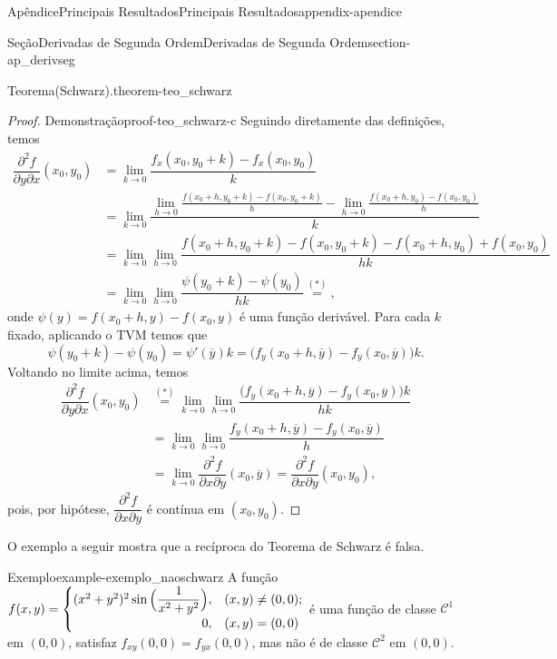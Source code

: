 \documentclass[oneside,10pt,]{book}
\numberwithin{equation}{section}
\begin{document}
\begin{appendixptx}{Apêndice}{Principais Resultados}{}{Principais Resultados}{}{}{appendix-apendice}
\begin{sectionptx}{Seção}{Derivadas de Segunda Ordem}{}{Derivadas de Segunda Ordem}{}{}{section-ap_derivseg}
\begin{theorem}{Teorema}{(Schwarz).}{}{theorem-teo_schwarz}
\end{theorem}
\begin{proof}{Demonstração}{}{proof-teo_schwarz-c}
Seguindo diretamente das definições, temos%
\begin{align*}
\dfrac{\partial^2 f}{\partial y\partial
x}(x_0,y_0)
&=\lim\limits_{k\to
0}\dfrac{f_x(x_0,y_0+k)-f_x(x_0,y_0)}{k}\\
&=\lim\limits_{k\to
0}\dfrac{\lim\limits_{h\to
0}\frac{f(x_0+h,y_0+k)-f(x_0,y_0+k)}{h}-\lim\limits_{h\to
0}\frac{f(x_0+h,y_0)-f(x_0,y_0)}{h}}{k}\\
&=\lim\limits_{k\to 0}\lim\limits_{h\to 0}
\dfrac{f(x_0+h,y_0+k)-f(x_0,y_0+k)-f(x_0+h,y_0)+f(x_0,y_0)}{hk}\\
&=\lim\limits_{k\to 0}\lim\limits_{h\to 0}
\dfrac{\psi(y_0+k)-\psi(y_0)}{hk}\stackrel{(\ast)}{=},
\end{align*}
onde \(\psi(y)=f(x_0+h,y)-f(x_0,y)\) é uma função derivável. Para cada \(k\) fixado, aplicando o TVM temos que%
\begin{equation*}
\psi(y_0+k)-\psi(y_0)=\psi'(\overline{y})k=\big(f_y(x_0+h,\overline{y})
-f_y(x_0,\overline{y})\big)k.
\end{equation*}
Voltando no limite acima, temos%
\begin{align*}
\dfrac{\partial^2 f}{\partial y\partial
x}(x_0,y_0)
&\stackrel{(\ast)}{=}\lim\limits_{k\to 0}\lim\limits_{h\to 0}
\dfrac{\big(f_y(x_0+h,\overline{y})
-f_y(x_0,\overline{y})\big)k}{hk}\\
&=\lim\limits_{k\to
0}\lim\limits_{h\to 0}
\dfrac{f_y(x_0+h,\overline{y})
-f_y(x_0,\overline{y})}{h}\\
&=\lim\limits_{k\to
0}\dfrac{\partial^2 f}{\partial x\partial
y}(x_0,\overline{y})=\dfrac{\partial^2 f}{\partial x\partial
y}(x_0,y_0),
\end{align*}
pois, por hipótese, \(\dfrac{\partial^2 f}{\partial x\partial y}\) é contínua em \((x_0,y_0)\).%
\end{proof}
O exemplo a seguir mostra que a recíproca do Teorema de Schwarz é falsa.%
\begin{example}{Exemplo}{}{example-exemplo_naoschwarz}%
A função \(f(x,y)=\begin{cases}
(x^2+y^2)^2\sin\Big(\dfrac{1}{x^2+y^2}\Big),&(x,y)\neq (0,0);\\
\hfill 0,& (x,y)=(0,0)\end{cases}\) é uma função de classe \(\mathscr{C}^1\) em \((0,0)\), satisfaz \(f_{xy}(0,0)=f_{yx}(0,0)\), mas não é de classe \(\mathscr{C}^2\) em \((0,0)\).%
\par

\end{example}
\end{sectionptx}
\end{appendixptx}
\end{document}
